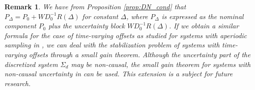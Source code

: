 \documentclass[letterpaper, 12pt, draftcls, onecolumn]{ieeeconf}
\newtheorem{remark}[theorem]{Remark}
\begin{document}
\begin{remark}
		We have from Proposition \ref{prop:DN_cond}
		that $P_{\Delta} = P_0 + WD_0^{-1}R(\Delta)$ for constant $\Delta$, where
		$P_\Delta$ is expressed as the nominal component $P_0$ 
		plus the uncertainty block $WD_0^{-1}R(\Delta)$.
		If we obtain a similar formula for the case of time-varying offsets as
		studied for systems with aperiodic sampling in \cite{Fujioka2009},
		we can deal with the stabilization problem of systems with time-varying offsets
		through a small gain theorem. Although
		the uncertainty part of the discretized system $\Sigma_d$ may be non-causal, 
		the small gain theorem for systems with non-causal uncertainty in \cite{Unal2008Automatica}
		can be used.
		This extension is a subject for future research.
\end{remark}
\end{document}
